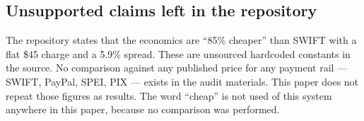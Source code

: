 \documentclass[sigconf,review]{acmart}
\begin{document}
\subsection{Unsupported claims left in the repository}
The repository states that the economics are ``85\% cheaper'' than SWIFT with a
flat \$45 charge and a 5.9\% spread. These are unsourced hardcoded constants in
the source. No comparison against any published price for any payment rail ---
SWIFT, PayPal, SPEI, PIX --- exists in the audit materials. This paper does not
repeat those figures as results. The word ``cheap'' is not used of this system
anywhere in this paper, because no comparison was performed.






\end{document}

